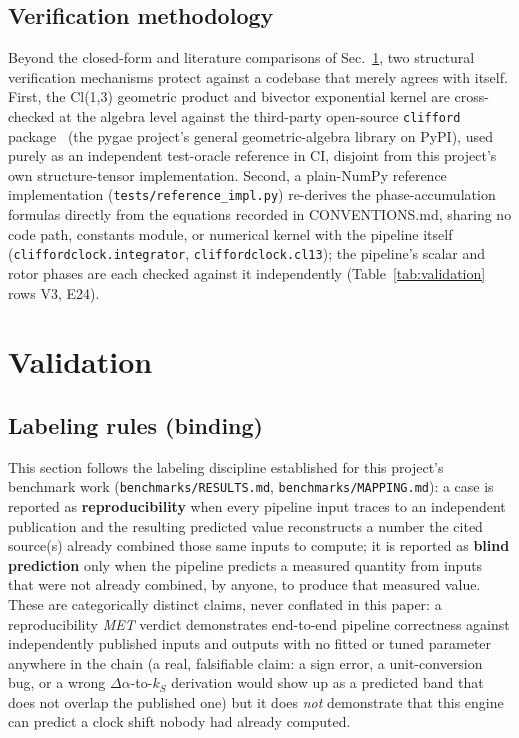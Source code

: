 \documentclass[aps,pra,superscriptaddress,groupedaddress,nofootinbib]{revtex4-2}
\begin{document}
\subsection{Verification methodology}

Beyond the closed-form and literature comparisons of
Sec.~\ref{sec:validation}, two structural verification mechanisms
protect against a codebase that merely agrees with itself. First, the
Cl(1,3) geometric product and bivector exponential kernel are
cross-checked at the algebra level against the third-party open-source
\texttt{clifford} package~\cite{pygae-clifford} (the pygae project's
general geometric-algebra library on PyPI), used purely as an independent
test-oracle reference in CI, disjoint from this project's own
structure-tensor implementation. Second, a
plain-NumPy reference implementation
(\texttt{tests/reference\_impl.py}) re-derives the phase-accumulation
formulas directly from the equations recorded in CONVENTIONS.md,
sharing no code path, constants module, or numerical kernel with the
pipeline itself (\texttt{cliffordclock.integrator},
\texttt{cliffordclock.cl13}); the pipeline's scalar and rotor phases
are each checked against it independently (Table~\ref{tab:validation}
rows V3, E24).

\section{Validation}
\label{sec:validation}

\subsection{Labeling rules (binding)}

This section follows the labeling discipline established for this
project's benchmark work (\texttt{benchmarks/RESULTS.md},
\texttt{benchmarks/MAPPING.md}): a case is reported as
\textbf{reproducibility} when every pipeline input traces to an
independent publication and the resulting predicted value reconstructs
a number the cited source(s) already combined those same inputs to
compute; it is reported as \textbf{blind prediction} only when the
pipeline predicts a measured quantity from inputs that were not already
combined, by anyone, to produce that measured value. These are
categorically distinct claims, never conflated in this paper: a
reproducibility \textit{MET} verdict demonstrates end-to-end pipeline
correctness against independently published inputs and outputs with no
fitted or tuned parameter anywhere in the chain (a real, falsifiable
claim: a sign error, a unit-conversion bug, or a wrong
$\Delta\alpha$-to-$k_S$ derivation would show up as a predicted band
that does not overlap the published one) but it does \emph{not}
demonstrate that this engine can predict a clock shift nobody had
already computed.
\end{document}
